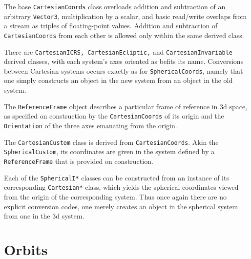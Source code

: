 \documentclass[11pt,preprint,flushrt]{aastex}
\begin{document}
The base \texttt{CartesianCoords} class overloads addition and subtraction of an arbitrary \texttt{Vector3},  multiplication by a scalar, and basic read/write overlaps from a stream as triples of floating-point values.  Addition and subtraction of \texttt{CartesianCoords} from each other is allowed only within the same derived class.

There are \texttt{CartesianICRS, CartesianEcliptic,} and \texttt{CartesianInvariable} derived classes, with each system's axes oriented as befits its name.  Conversions between Cartesian systems occurs exactly as for \texttt{SphericalCoords}, namely that one simply constructs an object in the new system from an object in the old system. 

The \texttt{ReferenceFrame} object describes a particular frame of reference in 3d space, as specified on construction by the \texttt{CartesianCoords} of its origin and the \texttt{Orientation} of the three axes emanating from the origin.  

The \texttt{CartesianCustom} class is derived from \texttt{CartesianCoords}.  Akin the \texttt{SphericalCustom}, its coordinates are given in the system defined by a \texttt{ReferenceFrame} that is provided on construction.

Each of the \texttt{SphericalI*} classes can be constructed from an instance of its corresponding \texttt{Cartesian*} class, which yields the spherical coordinates viewed from the origin of the corresponding system.  Thus once again there are no explicit conversion codes, one merely creates an object in the spherical system from one in the 3d system.

\section{Orbits}
\end{document}
